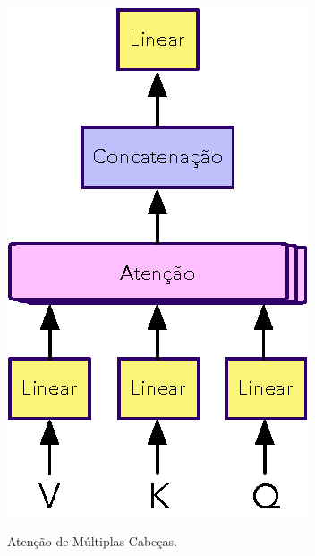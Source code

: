 \begin{frame}
	\begin{figure}[!ht]
		\centering
		\includegraphics[scale=0.75]{figs/multi_head_attention.eps}	
		\label{f.multi_head_attention}
		\caption{Atenção de Múltiplas Cabeças.}
	\end{figure}
\end{frame}